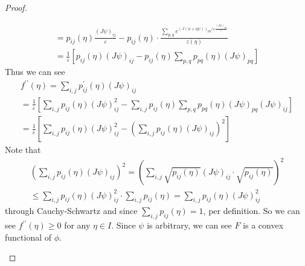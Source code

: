 \begin{proof}
\begin{enumerate}[label=(\roman*)]
\[\begin{gathered}
			=p_{i j}(\eta) \frac{(J \psi)_{i j}}{\varepsilon}-p_{i j}(\eta) \cdot \frac{\sum_{p, q} e^{(J(\phi+\eta \psi))_{p q} / \varepsilon \frac{(J \psi)_{p q}}{\varepsilon}}}{z(\eta)} \\
			=\frac{1}{\varepsilon}\left[p_{i j}(\eta)(J \psi)_{i j}-p_{i j}(\eta) \sum_{p, q} p_{p q}(\eta)(J \psi)_{p q}\right]
		\end{gathered}
		\]
		Thus we can see
		\[ \begin{gathered}
			f^{\prime \prime}(\eta)=\sum_{i, j} p_{i j}^{\prime}(\eta)(J \psi)_{i j} \\
			=\frac{1}{\varepsilon}\left[\sum_{i, j} p_{i j}(\eta)(J \psi)_{i j}^{2}-\sum_{i, j} p_{i j}(\eta) \sum_{p, q} p_{p q}(\eta)(J \psi)_{p q}(J \psi)_{i j}\right] \\
			=\frac{1}{\varepsilon}\left[\sum_{i, j} p_{i j}(\eta)(J \psi)_{i j}^{2}-\left(\sum_{i, j} p_{i j}(\eta)(J \psi)_{i j}\right)^{2}\right]
		\end{gathered} \]
		Note that
		\[ \begin{gathered}
			\left(\sum_{i, j} p_{i j}(\eta)(J \psi)_{i j}\right)^{2}=\left(\sum_{i, j} \sqrt{p_{i j}(\eta)}(J \psi)_{i j} \cdot \sqrt{p_{i j}(\eta)}\right)^{2} \\
			\leq \sum_{i, j} p_{i j}(\eta)(J \psi)_{i j}^{2} \cdot \sum_{i, j} p_{i j}(\eta)=\sum_{i, j} p_{i j}(\eta)(J \psi)_{i j}^{2}
		\end{gathered} \]
		through Cauchy-Schwartz and since $\sum_{i, j} p_{i j}(\eta)=1$, per definition. So we can see $f^{\prime \prime}(\eta) \geq 0$ for any $\eta \in I$. Since $\psi$ is arbitrary, we can see $F$ is a convex functional of $\phi$.\par 
		

\end{enumerate}
\end{proof}
